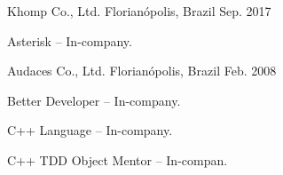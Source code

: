 

\begin{cventries}

  \cventry
    {} %
    {Khomp Co., Ltd.} %
    {Florianópolis, Brazil} %
    {Sep. 2017} %
    {
      \begin{cvitems} %
        \item {Asterisk – In-company.}
      \end{cvitems}
    }

  \cventry
    {} %
    {Audaces Co., Ltd.} %
    {Florianópolis, Brazil} %
    {Feb. 2008} %
    {
      \begin{cvitems} %
        \item {Better Developer – In-company.}
        \item {C++ Language – In-company.}
        \item {C++ TDD Object Mentor – In-compan.}
      \end{cvitems}
    }

\end{cventries}
